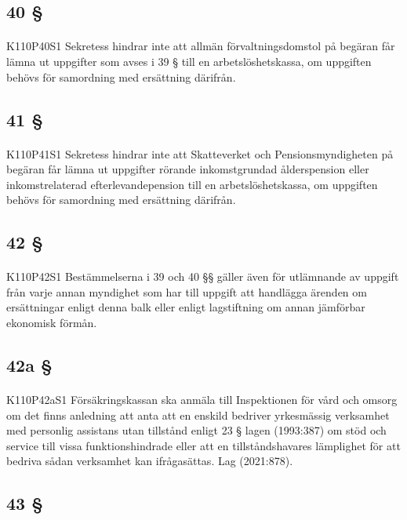 \documentclass[a4paper,notitlepage,openany,10pt]{book}
\begin{document}
\subsection*{40 §}
\paragraph*{}
{\tiny K110P40S1}
Sekretess hindrar inte att allmän förvaltningsdomstol på begäran får lämna ut uppgifter som avses i 39 § till en arbetslöshetskassa, om uppgiften behövs för samordning med ersättning därifrån.
\subsection*{41 §}
\paragraph*{}
{\tiny K110P41S1}
Sekretess hindrar inte att Skatteverket och Pensionsmyndigheten på begäran får lämna ut uppgifter rörande inkomstgrundad ålderspension eller inkomstrelaterad efterlevandepension till en arbetslöshetskassa, om uppgiften behövs för samordning med ersättning därifrån.
\subsection*{42 §}
\paragraph*{}
{\tiny K110P42S1}
Bestämmelserna i 39 och 40 §§ gäller även för utlämnande av uppgift från varje annan myndighet som har till uppgift att handlägga ärenden om ersättningar enligt denna balk eller enligt lagstiftning om annan jämförbar ekonomisk förmån.
\subsection*{42a §}
\paragraph*{}
{\tiny K110P42aS1}
Försäkringskassan ska anmäla till Inspektionen för vård och omsorg om det finns anledning att anta att en enskild bedriver yrkesmässig verksamhet med personlig assistans utan tillstånd enligt 23 § lagen (1993:387) om stöd och service till vissa funktionshindrade eller att en tillståndshavares lämplighet för att bedriva sådan verksamhet kan ifrågasättas.
Lag (2021:878).
\subsection*{43 §}
\end{document}
